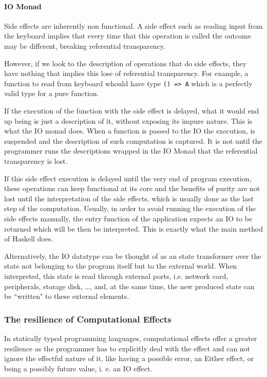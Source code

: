 \documentclass[../main.tex]{subfiles}
\begin{document}


\paragraph{IO Monad}
Side effects are inherently non functional. A side effect such as reading input
from the keyboard implies that every time that this operation is called the
outcome may be different, breaking referential transparency.

However, if we look to the description of operations that do side effects, they
have nothing that implies this lose of referential transparency. For example,
a function to read from keyboard whould have type \texttt{() => A} which is a
perfectly valid type for a pure function.

If the execution of the function with the side effect is delayed, what it
would end up being is just a description of it, without exposing its impure
nature. This is what the IO monad does. When a function is passed to the IO
the execution, is suspended and the description of such computation is captured. It is not
until the programmer runs the descriptions wrapped in the IO Monad that the
referential transparency is lost.

If this side effect execution is delayed until the very end of program execution, these operations
can keep functional at its core and the benefits of purity are not lost until
the interpretation of the side effects, which is usually done as the last step of
the computation. Usually, in order to avoid running the execution of the side
effects manually, the entry function of the application expects an IO to be
returned which will be then be interpreted. This is exactly what the main method
of Haskell does\autocite{Hudak2000AIO}.

Alternatively, the IO datatype can be thought of as an state transformer over 
the state not belonging to the program itself but to the external world. When
interpreted, this state is read through external ports, i.e.
network card, peripherals, storage disk, \ldots, and, at the same time, the new produced 
state can be ``written" to these external elements.

\subsubsection{The resilience of Computational Effects}
In statically typed programming languages, computational effects offer a greater resilience as the
programmer has to explicitly deal with the effect and can not ignore the
effectful nature of it, like having a possible error, an Either effect, or being a possibly
future value, i. e. an IO effect.
\end{document}
